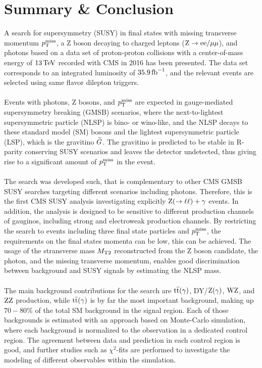 \chapter{Summary \& Conclusion}\label{chap:conclusion}

A search for supersymmetry (SUSY) in final states with missing transverse momentum $p_{\mathrm{T}}^\text{miss}$, a Z boson decaying to charged leptons ($\mathrm{Z}\to\mathrm{e}\mathrm{e}/{\mu}\mu$), and photons based on a data set of proton-proton collisions with a center-of-mass energy of $13\,\text{Te\hspace{-.08em}V}$ recorded with CMS in 2016 has been presented. The data set corresponds to an integrated luminosity of $35.9\mbox{\ensuremath{\,\text{fb}^\text{$-$1}}}$, and the relevant events are selected using same flavor dilepton triggers.\\\\
Events with photons, Z bosons, and $p_{\mathrm{T}}^\text{miss}$ are expected in gauge-mediated supersymmetry breaking (GMSB) scenarios, where the next-to-lightest supersymmetric particle (NLSP) is bino- or wino-like, and the NLSP decays to these standard model (SM) bosons and the lightest supersymmetric particle (LSP), which is the gravitino $\widetilde{G}$. The gravitino is predicted to be stable in R-parity conserving SUSY scenarios and leaves the detector undetected, thus giving rise to a significant amount of $p_{\mathrm{T}}^\text{miss}$ in the event.\\\\
The search was developed such, that is complementary to other CMS GMSB SUSY searches targeting different scenarios including photons. Therefore, this is the first CMS SUSY analysis investigating explicitly $\mathrm{Z}(\to\ell\ell)+\gamma$ events. In addition, the analysis is designed to be sensitive to different production channels of gauginos, including strong and electroweak production channels. By restricting the search to events including three final state particles and $p_{\mathrm{T}}^\text{miss}$, the requirements on the final states momenta can be low, this can be achieved. The usage of the stransverse mass $M_{\mathrm{T2}}$ reconstructed from the Z boson candidate, the photon, and the missing transverse momentum, enables good discrimination between background and SUSY signals by estimating the NLSP mass.\\\\
The main background contributions for the search are ${\mathrm{t}\overline{\mathrm{t}}}(\gamma)$, DY/$\mathrm{Z}(\gamma)$, $\mathrm{W}\mathrm{Z}$, and $\mathrm{Z}\mathrm{Z}$ production, while ${\mathrm{t}\overline{\mathrm{t}}}(\gamma)$ is by far the most important background, making up $70-80\%$ of the total SM background in the signal region. Each of those backgrounds is estimated with an approach based on Monte-Carlo simulation, where each background is normalized to the observation in a dedicated control region. The agreement between data and prediction in each control region is good, and further studies such as $\chi^2$-fits are performed to investigate the modeling of different observables within the simulation.\\
